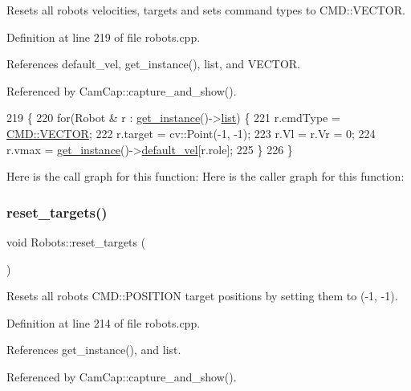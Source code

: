 Resets all robots\textquotesingle{} velocities, targets and sets command types to C\+M\+D\+::\+V\+E\+C\+T\+OR. 

Definition at line 219 of file robots.\+cpp.



References default\+\_\+vel, get\+\_\+instance(), list, and V\+E\+C\+T\+OR.



Referenced by Cam\+Cap\+::capture\+\_\+and\+\_\+show().


\begin{DoxyCode}
219                             \{
220     \textcolor{keywordflow}{for}(Robot & r : \hyperlink{class_robots_a589bce74db5f34af384952d48435168f}{get\_instance}()->\hyperlink{class_robots_a2c6b77265028f82a4342ca1ef15ed305}{list}) \{
221         r.cmdType = \hyperlink{serial_w_8hpp_ac6e89954deaa373db52a91ac6db50884}{CMD::VECTOR};
222         r.target = cv::Point(-1, -1);
223         r.Vl = r.Vr = 0;
224         r.vmax = \hyperlink{class_robots_a589bce74db5f34af384952d48435168f}{get\_instance}()->\hyperlink{class_robots_a6c03d49137645a67d5c5e39bb953a788}{default\_vel}[r.role];
225     \}
226 \}
\end{DoxyCode}
Here is the call graph for this function\+:
Here is the caller graph for this function\+:
\mbox{\label{class_robots_ade0caad007f6bbc5cdb35182a16780b7}} 
\subsubsection{\texorpdfstring{reset\+\_\+targets()}{reset\_targets()}}
{\footnotesize\ttfamily void Robots\+::reset\+\_\+targets (\begin{DoxyParamCaption}{ }\end{DoxyParamCaption})\hspace{0.3cm}{\ttfamily [static]}}

Resets all robots\textquotesingle{} C\+M\+D\+::\+P\+O\+S\+I\+T\+I\+ON target positions by setting them to (-\/1, -\/1). 

Definition at line 214 of file robots.\+cpp.



References get\+\_\+instance(), and list.



Referenced by Cam\+Cap\+::capture\+\_\+and\+\_\+show().



